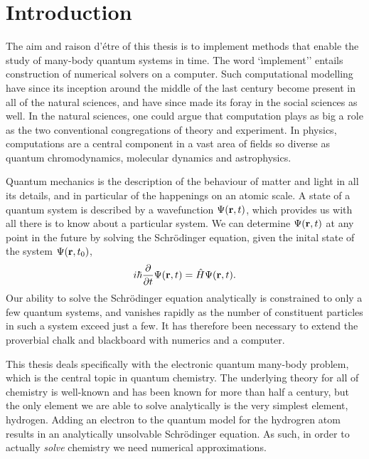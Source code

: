 \chapter{Introduction}

    The aim and raison d'étre of this thesis is to implement methods that enable the 
    study of many-body quantum systems in time. The word `ìmplement'' entails construction 
    of numerical solvers on a computer. Such computational modelling have since its 
    inception around the middle of the last century become present in all of the natural 
    sciences, and have since made its foray in the social sciences as well. In the 
    natural sciences, one could argue that computation plays as big a role as the two 
    conventional congregations of theory and experiment. In physics, computations are 
    a central component in a vast area of fields so diverse as
    quantum chromodynamics\cite{pederiva2018computing,vege2019solving},
    molecular dynamics\cite{stende2017constructing,treider2017speeding} and 
    astrophysics\cite{sand2016massive}.

    Quantum mechanics is the description of the behaviour of matter and light in all 
    its details, and in particular of the happenings on an atomic scale. A state of 
    a quantum system is described by a wavefunction $\Psi(\vb{r}, t)$, which provides 
    us with all there is to know about a particular system. We can determine
    $\Psi(\vb{r}, t)$
    at any point in the future by solving the Schrödinger equation, given the inital 
    state of the system $\Psi(\vb{r}, t_0)$,
    \begin{equation}
        i\hbar \frac{\partial}{\partial t} \Psi(\vb{r}, t) = \hat{H} \Psi(\vb{r}, t).
    \end{equation}
    Our ability to solve the Schrödinger equation analytically is constrained to only 
    a few quantum systems, and vanishes rapidly as the number of constituent particles in 
    such a system exceed just a few. It has therefore been necessary to extend the proverbial
    chalk and 
    blackboard with numerics and a computer.
    
    This thesis deals specifically with the electronic quantum many-body problem, 
    which is the central topic in quantum chemistry. The underlying theory for all of chemistry 
    is well-known and has been known for more than half a century, but the only element 
    we are able to solve analytically is the very simplest element, hydrogen.
    Adding an electron to the quantum model for the hydrogren atom results in an analytically 
    unsolvable Schrödinger equation. As such, in order to actually \emph{solve} chemistry we 
    need numerical approximations.


